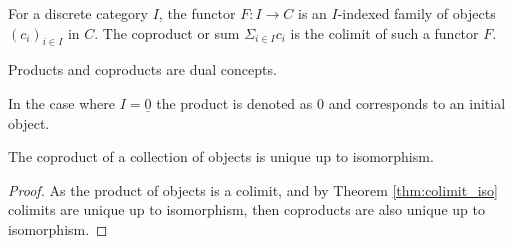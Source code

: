 \begin{definition}
	For a discrete category $I$, the functor $F:I\to C$ is an $I$-indexed family
	of objects $(c_i)_{i\in I}$ in $C$. The coproduct or sum $\Sigma_{i\in I} c_i$
	is the colimit of such a functor $F$.
	\parencite{leinster:basic_category_theory}
\end{definition}

\begin{remark}
	Products and coproducts are dual concepts.
\end{remark}

\begin{remark}
	In the case where $I=\underline{0}$ the product is denoted as $0$ and
	corresponds to an initial object.
\end{remark}

\begin{theorem}
	The coproduct of a collection of objects is unique up to isomorphism.

	\begin{proof}
		As the product of objects is a colimit, and by Theorem \ref{thm:colimit_iso}
		colimits are unique up to isomorphism, then coproducts are also unique up to
		isomorphism.
	\end{proof}
\end{theorem}
